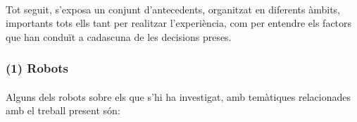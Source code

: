 \documentclass[12pt,a4paper,final,twoside]{article}
\begin{document}
\paragraph{}Tot seguit, s'exposa un conjunt d'antecedents, organitzat en diferents àmbits, importants tots ells tant per realitzar l'experiència, com per entendre els factors que han conduït a cadascuna de les decisions preses.

\label{Robots}
\subsubsection*{(1) Robots}
\paragraph{}Alguns dels robots sobre els que s'hi ha investigat, amb temàtiques relacionades amb el treball present són:
\end{document}
